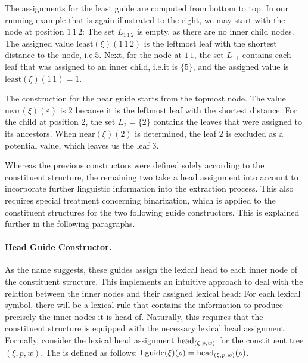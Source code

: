 \documentclass[../../document.tex]{subfiles}
\begin{document}
    \needspace{3cm}
    \begin{wrapfigure}[6]{r}{.3\linewidth}
        \centering
        
    \end{wrapfigure}
    The assignments for the least guide are computed from bottom to top.
    In our running example that is again illustrated to the right, we may start with the node at position \(1\,1\,2\): The set \(L_{1\,1\,2}\) is empty, as there are no inner child nodes. The assigned value \(\mathrm{least}(\xi)(1\,1\,2)\) is the leftmost leaf with the shortest distance to the node, i.e.\@ \(5\).
    Next, for the node at \(1\,1\), the set \(L_{1\,1}\) contains each leaf that was assigned to an inner child, i.e.\@ it is \(\{5\}\), and the assigned value is \(\mathrm{least}(\xi)(1\,1) = 1\).
    \exampleqed

    \begin{example}
        The construction for the near guide starts from the topmost node.
        The value \(\mathrm{near}(\xi)(\varepsilon)\) is \(2\) because it is the leftmost leaf with the shortest distance.
        For the child at position \(2\), the set \(L_{2} = \{2\}\) contains the leaves that were assigned to its ancestors.
        When \(\mathrm{near}(\xi)(2)\) is determined, the leaf \(2\) is excluded as a potential value, which leaves us the leaf \(3\).
    \end{example}

    Whereas the previous constructors were defined solely according to the constituent structure, the remaining two take a head assignment into account to incorporate further linguistic information into the extraction process.
    This also requires special treatment concerning binarization, which is applied to the constituent structures for the two following guide constructors.
    This is explained further in the following paragraphs.

    \paragraph{Head Guide Constructor.}
    As the name suggests, these guides assign the lexical head to each inner node of the constituent structure.
    This implements an intuitive approach to deal with the relation between the inner nodes and their assigned lexical head: For each lexical symbol, there will be a lexical rule that contains the information to produce precisely the inner nodes it is head of.
    Naturally, this requires that the constituent structure is equipped with the necessary lexical head assignment.
    Formally, consider the lexical head assignment \(\operatorname{head}_{(\xi,p,w)}\) for the constituent tree \((\xi, p, w)\).
    The  is defined as follows: \(\mathrm{hguide}(\xi)(\rho) = \operatorname{head}_{(\xi,p,w)}(\rho)\).
\end{document}

